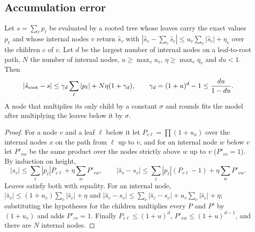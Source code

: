 \subsection{Accumulation error}\label{sec:accumulation}
\begin{lemma}\label{lem:tree}
Let $s=\sum_\ell p_\ell$ be evaluated by a rooted tree whose leaves carry the exact values $p_\ell$ and whose internal nodes $v$ return $\hat s_v$ with $|\hat s_v-\sum_c\hat s_c|\le u_v\sum_c|\hat s_c|+\eta_v$ over the children $c$ of $v$. Let $d$ be the largest number of internal nodes on a leaf-to-root path, $N$ the number of internal nodes, $u\ge\max_vu_v$, $\eta\ge\max_v\eta_v$ and $du<1$. Then
\begin{equation}
|\hat s_{\rm root}-s|\le\gamma_d\sum_\ell|p_\ell|+N\eta(1+\gamma_d),\qquad\gamma_d=(1+u)^d-1\le\frac{du}{1-du}.\label{eq:tree}
\end{equation}
A node that multiplies its only child by a constant $\sigma$ and rounds fits the model after multiplying the leaves below it by $\sigma$.
\end{lemma}
\begin{proof}
For a node $v$ and a leaf $\ell$ below it let $P_{v\ell}=\prod(1+u_x)$ over the internal nodes $x$ on the path from $\ell$ up to $v$, and for an internal node $w$ below $v$ let $P'_{vw}$ be the same product over the nodes strictly above $w$ up to $v$ ($P'_{vv}=1$). By induction on height,
\[|\hat s_v|\le\sum_\ell|p_\ell|P_{v\ell}+\eta\sum_wP'_{vw},\qquad|\hat s_v-s_v|\le\sum_\ell|p_\ell|(P_{v\ell}-1)+\eta\sum_wP'_{vw}.\]
Leaves satisfy both with equality. For an internal node, $|\hat s_v|\le(1+u_v)\sum_c|\hat s_c|+\eta$ and $|\hat s_v-s_v|\le\sum_c|\hat s_c-s_c|+u_v\sum_c|\hat s_c|+\eta$; substituting the hypotheses for the children multiplies every $P$ and $P'$ by $(1+u_v)$ and adds $P'_{vv}=1$. Finally $P_{v\ell}\le(1+u)^d$, $P'_{vw}\le(1+u)^{d-1}$, and there are $N$ internal nodes.
\end{proof}
